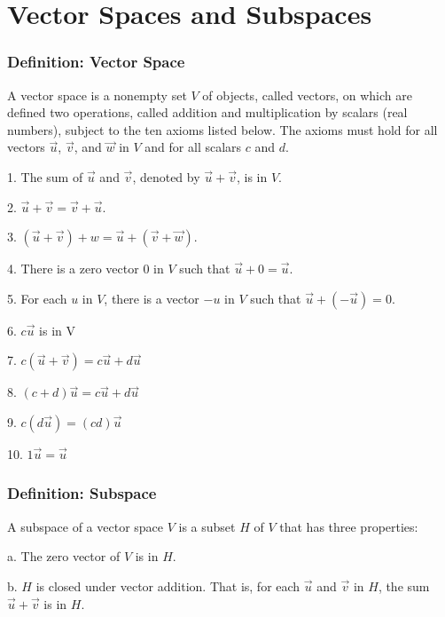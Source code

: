 \documentclass{article}
\begin{document}

\section{Vector Spaces and Subspaces}
\subsubsection*{Definition: Vector Space}
A vector space is a nonempty set $V$ of objects, called vectors, on which are defined two operations, called addition and multiplication by scalars (real numbers), subject to the ten axioms listed below. The axioms must hold for all vectors $\vec u$, $\vec v$, and $\vec w$ in $V$ and for all scalars $c$ and $d$. 

1. The sum of $\vec u$ and $\vec v$, denoted by $\vec u + \vec v$, is in $V$. 

2. $\vec u + \vec v = \vec v + \vec u$.

3. $(\vec u + \vec v) + w = \vec u + (\vec v + \vec w)$.

4. There is a zero vector $0$ in $V$ such that $\vec u + 0 = \vec u$.

5. For each $u$ in $V$, there is a vector $-u$ in $V$ such that $\vec u + (-\vec u) = 0$.

6. $c \vec u$ is in V

7. $c(\vec u + \vec v) = c \vec u + d \vec u$

8. $(c + d) \vec u = c \vec u + d \vec u$

9. $c(d \vec u) = (cd) \vec u$

10. $1\vec u = \vec u$

\subsubsection*{Definition: Subspace}
A subspace of a vector space $V$ is a subset $H$ of $V$ that has three properties: 

a. The zero vector of $V$ is in $H$.

b. $H$ is closed under vector addition. That is, for each $\vec u$ and $\vec v$ in $H$, the \indent sum $\vec u + \vec v$ is in $H$.
\end{document}
